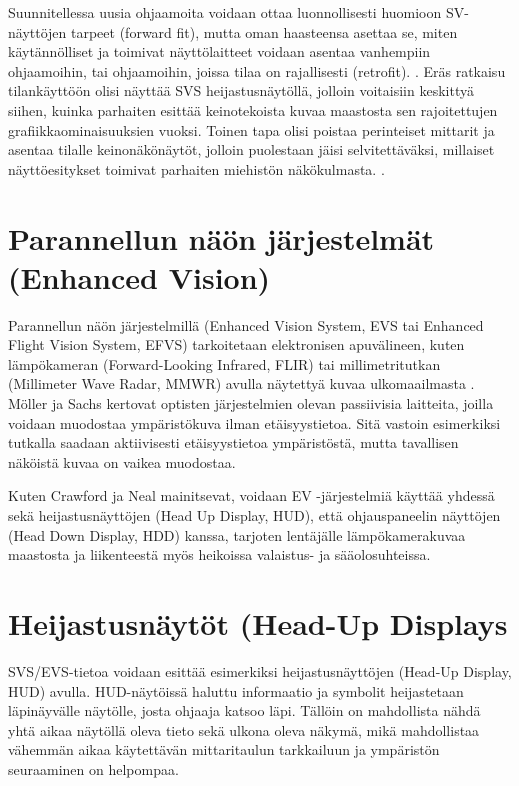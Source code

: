 \documentclass[utf8,bachelor,manualbib]{gradu3}
\begin{document}
Suunnitellessa uusia ohjaamoita voidaan ottaa luonnollisesti huomioon SV-näyttöjen tarpeet (forward fit), mutta oman haasteensa asettaa se, miten käytännölliset ja toimivat näyttölaitteet voidaan asentaa vanhempiin ohjaamoihin, tai ohjaamoihin, joissa tilaa on rajallisesti (retrofit). \citep{prinzel2004}. Eräs ratkaisu tilankäyttöön olisi näyttää SVS heijastusnäytöllä, jolloin voitaisiin keskittyä siihen, kuinka parhaiten esittää keinotekoista kuvaa maastosta sen rajoitettujen grafiikkaominaisuuksien vuoksi. Toinen tapa olisi poistaa perinteiset mittarit ja asentaa tilalle keinonäkönäytöt, jolloin puolestaan jäisi selvitettäväksi, millaiset näyttöesitykset toimivat parhaiten miehistön näkökulmasta. \citep{prinzel2004}.

\section{Parannellun näön järjestelmät (Enhanced Vision)}

Parannellun näön järjestelmillä (Enhanced Vision System, EVS tai Enhanced Flight Vision System, EFVS) tarkoitetaan elektronisen apuvälineen, kuten lämpökameran (Forward-Looking Infrared, FLIR) tai millimetritutkan (Millimeter Wave Radar, MMWR) avulla näytettyä kuvaa ulkomaailmasta \citep{baileyym2007}. Möller ja Sachs \citeyearpar{mollersachs1994} kertovat optisten järjestelmien olevan passiivisia laitteita, joilla voidaan muodostaa ympäristökuva ilman etäisyystietoa. Sitä vastoin esimerkiksi tutkalla saadaan aktiivisesti etäisyystietoa ympäristöstä, mutta tavallisen näköistä kuvaa on vaikea muodostaa.

Kuten Crawford ja Neal \citeyearpar{crawfordneal2006} mainitsevat, voidaan EV -järjestelmiä käyttää yhdessä sekä heijastusnäyttöjen (Head Up Display, HUD), että ohjauspaneelin näyttöjen (Head Down Display, HDD) kanssa, tarjoten lentäjälle lämpökamerakuvaa maastosta ja liikenteestä myös heikoissa valaistus- ja sääolosuhteissa.

\section{Heijastusnäytöt (Head-Up Displays}

SVS/EVS-tietoa voidaan esittää esimerkiksi heijastusnäyttöjen (Head-Up Display, HUD) avulla. HUD-näytöissä haluttu informaatio ja symbolit heijastetaan läpinäyvälle näytölle, josta ohjaaja katsoo läpi. Tällöin on mahdollista nähdä yhtä aikaa näytöllä oleva tieto sekä ulkona oleva näkymä, mikä mahdollistaa vähemmän aikaa käytettävän mittaritaulun tarkkailuun ja ympäristön seuraaminen on helpompaa. \citep{crawfordneal2006}
\end{document}
